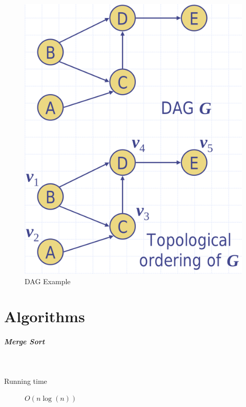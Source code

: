 \documentclass[11pt,twoside,twocolumn,landscape]{article}
\begin{document}
\begin{figure}[htbp]
\centering
\includegraphics[width=.9\linewidth]{img/dag.png}
\caption{\label{fig:org609ead8}DAG Example}
\end{figure}

\section{Algorithms}
\label{sec:orgd3788c3}
\subparagraph{Merge Sort} \
\label{sec:org1923d2e}

\begin{description}
\item[{Running time}] \(O(n \log(n))\)
\end{description}
\end{document}
